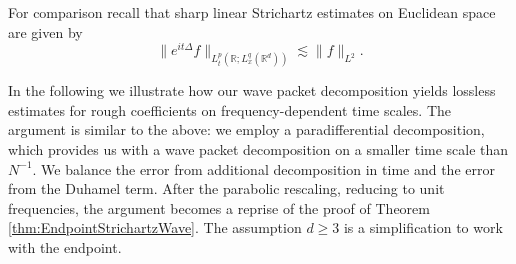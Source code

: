 \documentclass{amsart}
\theoremstyle{definition}
\newcommand{\R}{\mathbb{R}}
\begin{document}
For comparison recall that sharp linear Strichartz estimates on Euclidean space are given by
\begin{equation*}
\| e^{it \Delta} f \|_{L_t^p(\R;L^q_x(\R^d))} \lesssim \| f \|_{L^2}.
\end{equation*}

In the following we illustrate how our wave packet decomposition yields lossless estimates for rough coefficients on frequency-dependent time scales. The argument is similar to the above: we employ a paradifferential decomposition, which provides us with a wave packet decomposition on a smaller time scale than $N^{-1}$. We balance the error from additional decomposition in time and the error from the Duhamel term. After the parabolic rescaling, reducing to unit frequencies, the argument becomes  a reprise of the proof of Theorem \ref{thm:EndpointStrichartzWave}. The assumption $d \geq 3$ is a simplification to work with the endpoint.
\end{document}
